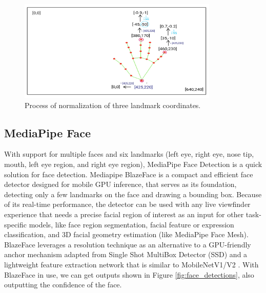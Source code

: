 \begin{figure}
	\centering
	\includegraphics[width = 0.85\textwidth]{images/normalise.pdf}
	\caption{Process of normalization of three landmark coordinates.}
		
	\label{fig:normalization}
\end{figure}

\subsection{MediaPipe Face}
With support for multiple faces and six landmarks (left eye, right eye, nose tip, mouth, left eye region, and right eye region), MediaPipe Face Detection is a quick solution for face detection. Mediapipe BlazeFace \cite{bazarevsky2019blazeface} is a compact and efficient face detector designed for mobile GPU inference, that serves as its foundation, detecting only a few landmarks on the face and drawing a bounding box. Because of its real-time performance, the detector can be used with any live viewfinder experience that needs a precise facial region of interest as an input for other task-specific models, like face region segmentation, facial feature or expression classification, and 3D facial geometry estimation (like MediaPipe Face Mesh). BlazeFace leverages a resolution technique as an alternative to a GPU-friendly anchor mechanism adapted from Single Shot MultiBox Detector (SSD) \cite{Liu_2016} and a lightweight feature extraction network that is similar to MobileNetV1/V2 \cite{howard2017mobilenets}. With BlazeFace in use,
 we can get outputs shown in Figure \ref{fig:face_detections}, also outputting the confidence of the face. 


